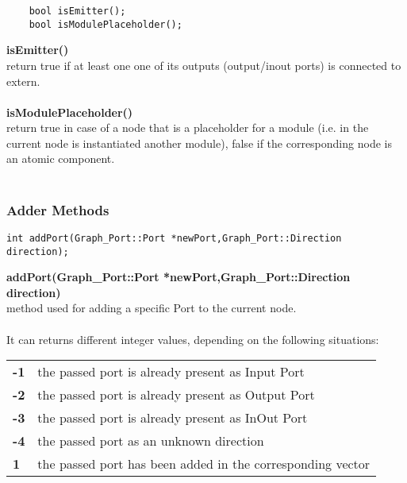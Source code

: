 \documentclass{article}
\begin{document}
\begin{mdframed}[hidealllines=true, backgroundcolor=magenta!10]
	\begin{lstlisting}
	bool isEmitter();
	bool isModulePlaceholder();
	\end{lstlisting}
\end{mdframed}

\textbf{isEmitter()}\\
return true if at least one one of its outputs (output/inout ports) is connected to extern.\\\\

\textbf{isModulePlaceholder()}\\
return true in case of a node that is a placeholder for a module (i.e. in the current node is instantiated another module), false if the corresponding node is an atomic component.\\\\

\subsubsection{Adder Methods}

\begin{mdframed}[hidealllines=true, backgroundcolor=magenta!10]
	\begin{lstlisting}[basicstyle=\tiny]
	int addPort(Graph_Port::Port *newPort,Graph_Port::Direction direction);
	\end{lstlisting}
\end{mdframed}

\textbf{addPort(Graph\_Port::Port *newPort,Graph\_Port::Direction direction)}\\
method used for adding a specific Port to the current node.\\\\

It can returns different integer values, depending on the following situations:\\

	\begin{tabular}{ll}
	\textbf{-1} & the passed port is already present as Input Port\\
	\textbf{-2} & the passed port is already present as Output Port\\
	\textbf{-3} & the passed port is already present as InOut Port\\
	\textbf{-4} & the passed port as an unknown direction\\
	\textbf{ 1} & the passed port has been added in the corresponding vector\\
	\end{tabular}
\end{document}
